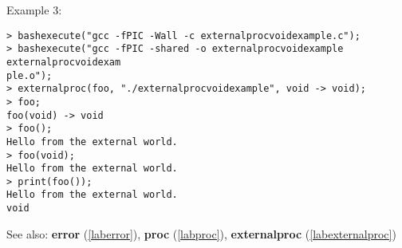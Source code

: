 \noindent Example 3: 
\begin{center}\begin{minipage}{15cm}\begin{Verbatim}[frame=single]
> bashexecute("gcc -fPIC -Wall -c externalprocvoidexample.c");
> bashexecute("gcc -fPIC -shared -o externalprocvoidexample externalprocvoidexam
ple.o");
> externalproc(foo, "./externalprocvoidexample", void -> void);
> foo;
foo(void) -> void
> foo();
Hello from the external world.
> foo(void);
Hello from the external world.
> print(foo());
Hello from the external world.
void
\end{Verbatim}
\end{minipage}\end{center}
See also: \textbf{error} (\ref{laberror}), \textbf{proc} (\ref{labproc}), \textbf{externalproc} (\ref{labexternalproc})
